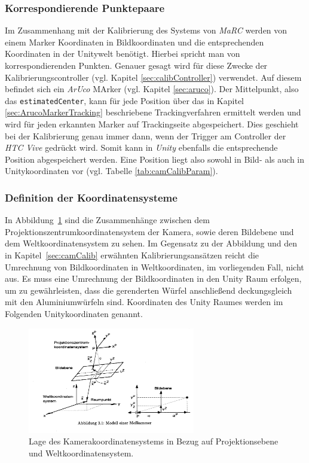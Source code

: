\subsubsection{Korrespondierende Punktepaare} \label{sec:Korrespondenz} 
Im Zusammenhang mit der Kalibrierung des Systems von \textit{MaRC} werden von einem Marker Koordinaten in Bildkoordinaten und die entsprechenden Koordinaten in der Unitywelt benötigt. Hierbei spricht man von korrespondierenden Punkten. Genauer gesagt wird für diese Zwecke der Kalibrierungscontroller (vgl. Kapitel \ref{sec:calibController}) verwendet. Auf diesem befindet sich ein \textit{ArUco} MArker (vgl. Kapitel \ref{sec:aruco}). Der Mittelpunkt, also das \texttt{estimatedCenter}, kann für jede Position über das in Kapitel \ref{sec:ArucoMarkerTracking} beschriebene Trackingverfahren ermittelt werden und wird für jeden erkannten Marker auf Trackingseite abgespeichert. Dies geschieht bei der Kalibrierung genau immer dann, wenn der Trigger am Controller der \textit{HTC Vive} gedrückt wird. Somit kann in \textit{Unity} ebenfalls die entsprechende Position abgespeichert werden. Eine Position liegt also sowohl in Bild- als auch in Unitykoordinaten vor (vgl. Tabelle \ref{tab:camCalibParam}).  

\subsubsection{Definition der Koordinatensysteme} \label{sec:DefKoords} 
In Abbildung~\ref{fig:cameraCalib} sind die Zusammenhänge zwischen dem Projektionszentrumkoordinatensystem der Kamera, sowie deren Bildebene und dem Weltkoordinatensystem zu sehen. Im Gegensatz zu der Abbildung und den in Kapitel~\ref{sec:camCalib} erwähnten Kalibrierungsansätzen reicht die Umrechnung von Bildkoordinaten in Weltkoordinaten, im vorliegenden Fall, nicht aus. Es muss eine Umrechnung der Bildkoordinaten in den Unity Raum erfolgen, um zu gewährleisten, dass die gerenderten Würfel anschließend deckungsgleich mit den Aluminiumwürfeln sind. Koordinaten des Unity Raumes werden im Folgenden Unitykoordinaten genannt.\\

\begin{figure}[H]
		\centering
		\includegraphics[width=0.65\textwidth , trim = 0mm 65mm 270mm 0mm, clip]{Bilder/cameraCalib.jpg}
			\caption{Lage des Kamerakoordinatensystems in Bezug auf Projektionsebene und Weltkoordinatensystem. \cite{Meisel:77890}}
			\label{fig:cameraCalib}
	\end{figure}

